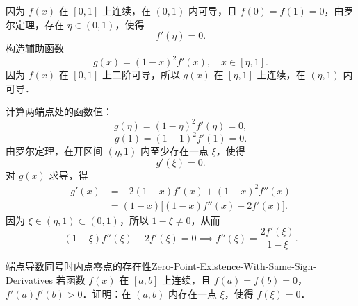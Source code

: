 \begin{myproof}
    因为 $f(x)$ 在 $[0, 1]$ 上连续，在 $(0, 1)$ 内可导，且 $f(0) = f(1) = 0$，由罗尔定理，存在 $\eta \in (0, 1)$，使得
    \begin{equation}
        f'(\eta) = 0.
    \end{equation}
    构造辅助函数
    \begin{equation}
        g(x) = (1 - x)^2 f'(x), \quad x \in [\eta, 1].
    \end{equation}
    因为 $f(x)$ 在 $[0, 1]$ 上二阶可导，所以 $g(x)$ 在 $[\eta, 1]$ 上连续，在 $(\eta, 1)$ 内可导．

    计算两端点处的函数值：
    \begin{equation}
        g(\eta) = (1 - \eta)^2 f'(\eta) = 0,
    \end{equation}
    \begin{equation}
        g(1) = (1 - 1)^2 f'(1) = 0.
    \end{equation}
    由罗尔定理，在开区间 $(\eta, 1)$ 内至少存在一点 $\xi$，使得
    \begin{equation}
        g'(\xi) = 0.
    \end{equation}
    对 $g(x)$ 求导，得
    \begin{equation}
        \begin{aligned}
            g'(x) & = -2(1 - x)f'(x) + (1 - x)^2 f''(x)            \\
                  & = (1 - x)\bigl[ (1 - x)f''(x) - 2f'(x) \bigr].
        \end{aligned}
    \end{equation}
    因为 $\xi \in (\eta, 1) \subset (0, 1)$，所以 $1 - \xi \neq 0$，从而
    \begin{equation}
        (1 - \xi)f''(\xi) - 2f'(\xi) = 0 \implies f''(\xi) = \frac{2f'(\xi)}{1 - \xi}.
    \end{equation}
\end{myproof}

\begin{problem}{端点导数同号时内点零点的存在性}{Zero-Point-Existence-With-Same-Sign-Derivatives}
    若函数 $f(x)$ 在 $[a, b]$ 上连续，且 $f(a) = f(b) = 0$，$f'(a)f'(b) > 0$．证明：在 $(a, b)$ 内存在一点 $\xi$，使得 $f(\xi) = 0$．
\end{problem}

